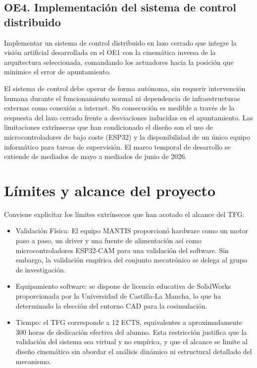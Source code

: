 \subsection{OE4. Implementación del sistema de control distribuido}
Implementar un sistema de control distribuido en lazo cerrado que integre la visión artificial desarrollada en el OE1 con la cinemática inversa de la arquitectura seleccionada, comandando los actuadores hacia la posición que minimice el error de apuntamiento.

El sistema de control debe operar de forma autónoma, sin requerir intervención humana durante el funcionamiento normal ni dependencia de infraestructuras externas como conexión a internet. Su consecución es medible a través de la respuesta del lazo cerrado frente a desviaciones inducidas en el apuntamiento. Las limitaciones extrínsecas que han condicionado el diseño son el uso de microcontroladores de bajo coste (ESP32) y la disponibilidad de un único equipo informático para tareas de supervisión. El marco temporal de desarrollo se extiende de mediados de mayo a mediados de junio de 2026.

\section{Límites y alcance del proyecto}
Conviene explicitar los límites extrínsecos que han acotado el alcance del TFG:

\begin{itemize}
\item{Validación Física:} El equipo MANTIS proporcionó hardware como un motor paso a paso, un driver y una fuente de alimentación así como microcontroladores ESP32-CAM para una validación del software. Sin embargo, la validación empírica del conjunto mecatrónico se delega al grupo de investigación.

\item{Equipamiento software:} se dispone de licencia educativa de SolidWorks proporcionada por la Universidad de Castilla-La Mancha, lo que ha determinado la elección del entorno CAD para la cosimulación.

\item{Tiempo:} el TFG corresponde a 12 ECTS, equivalentes a aproximadamente 300 horas de dedicación efectiva del alumno. Esta restricción justifica que la validación del sistema sea virtual y no empírica, y que el alcance se limite al diseño cinemático sin abordar el análisis dinámico ni estructural detallado del mecanismo.
\end{itemize}
